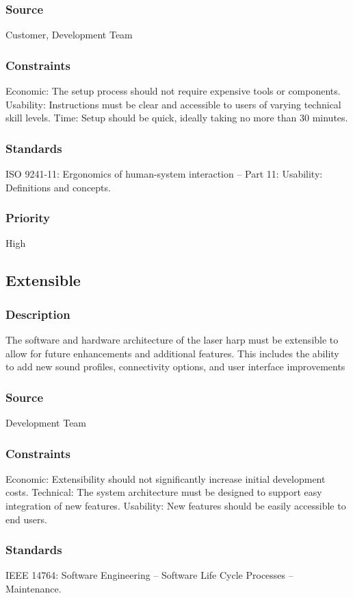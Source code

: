 \subsubsection{Source}
Customer, Development Team
\subsubsection{Constraints}
Economic: The setup process should not require expensive tools or components.
Usability: Instructions must be clear and accessible to users of varying technical skill levels.
Time: Setup should be quick, ideally taking no more than 30 minutes.
\subsubsection{Standards}
ISO 9241-11: Ergonomics of human-system interaction – Part 11: Usability: Definitions and concepts.
\subsubsection{Priority}
High


\subsection{Extensible}
\subsubsection{Description}
The software and hardware architecture of the laser harp must be extensible to allow for future enhancements and additional features. This includes the ability to add new sound profiles, connectivity options, and user interface improvements
\subsubsection{Source}
Development Team
\subsubsection{Constraints}
Economic: Extensibility should not significantly increase initial development costs.
Technical: The system architecture must be designed to support easy integration of new features.
Usability: New features should be easily accessible to end users.
\subsubsection{Standards}
IEEE 14764: Software Engineering – Software Life Cycle Processes – Maintenance.
